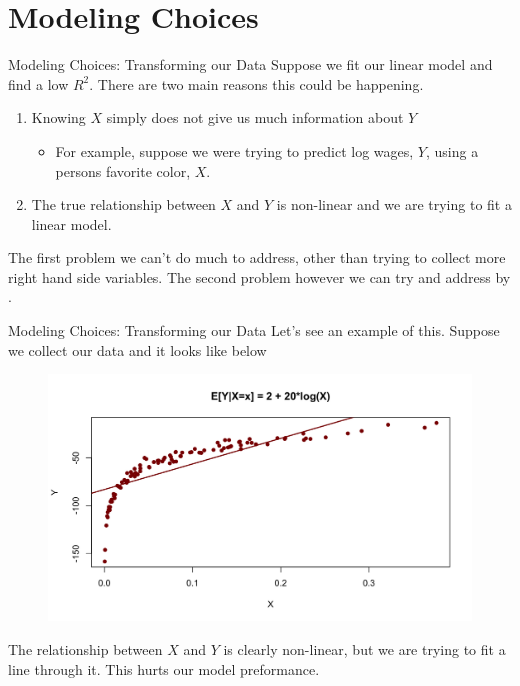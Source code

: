 \documentclass[notheorems, 9pt]{beamer}
\begin{document}
\section{Modeling Choices}%
\begin{frame}{Modeling Choices: Transforming our Data} 
	\label{frame:m1}
	Suppose we fit our linear model and find a low \(R^2\). There are two main reasons this could be happening.
	\begin{enumerate}
		\item<1-> Knowing \(X\) simply does not give us much information about  \(Y\)
		 \begin{itemize}
			\item<2-> For example, suppose we were trying to predict log wages, \(Y\), using a persons favorite color,  \(X\).
		\end{itemize}
		\item<3-> The true relationship between \(X\) and  \(Y\) is non-linear and we are trying to fit a linear model.
	\end{enumerate}
	The first problem we can't do much to address, other than trying to collect more right hand side variables. The second problem however we can try and address by .
\end{frame}
\begin{frame}{Modeling Choices: Transforming our Data} 
	\label{frame:m2}
	Let's see an example of this. Suppose we collect our data and it looks like below
	\begin{figure}[htpb]
		\centering
		\includegraphics[width=0.8\linewidth]{nonlinear1.png}
	\end{figure}
	The relationship between \(X\) and  \(Y\) is clearly non-linear, but we are trying to fit a line through it. This hurts our model preformance.
\end{frame}
\end{document}
